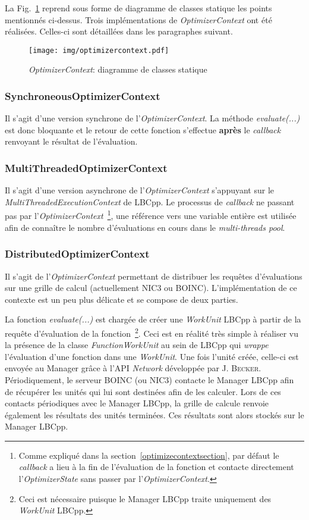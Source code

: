 \documentclass[a4paper, 11pt]{report}
\begin{document}
La Fig.~\ref{optimizercontext} reprend sous forme de diagramme de classes statique les points mentionnés ci-dessus. Trois implémentations de \textit{OptimizerContext} ont été réalisées. Celles-ci sont détaillées dans les paragraphes suivant.

\begin{figure}[!h]
\centering
\texttt{[image: img/optimizercontext.pdf]}
\caption{\textit{OptimizerContext}: diagramme de classes statique}
\label{optimizercontext}
\end{figure}

\subsubsection{SynchroneousOptimizerContext} 
Il s'agit d'une version synchrone de l'\textit{OptimizerContext}. La méthode \textit{evaluate(...)} est donc bloquante et le retour de cette fonction s'effectue \textbf{après} le \textit{callback} renvoyant le résultat de l'évaluation.

\subsubsection{MultiThreadedOptimizerContext} 
Il s'agit d'une version asynchrone de l'\textit{OptimizerContext} s'appuyant sur le \textit{MultiThreadedExecutionContext} de LBCpp. Le processus de \textit{callback} ne passant pas par l'\textit{OptimizerContext}~\footnote{Comme expliqué dans la section~\ref{optimizecontextsection}, par défaut le \textit{callback} a lieu à la fin de l'évaluation de la fonction et contacte directement l'\textit{OptimizerState} sans passer par l'\textit{OptimizerContext}.}, une référence vers une variable entière est utilisée afin de connaître le nombre d'évaluations en cours dans le \textit{multi-threads pool}.

\subsubsection{DistributedOptimizerContext}
Il s'agit de l'\textit{OptimizerContext} permettant de distribuer les requêtes d'évaluations sur une grille de calcul (actuellement \textsc{NIC3} ou \textsc{BOINC}). L'implémentation de ce contexte est un peu plus délicate et se compose de deux parties.

La fonction \textit{evaluate(...)} est chargée de créer une \textit{WorkUnit} LBCpp à partir de la requête d'évaluation de la fonction~\footnote{Ceci est nécessaire puisque le Manager LBCpp traite uniquement des \textit{WorkUnit} LBCpp.}. Ceci est en réalité très simple à réaliser vu la présence de la classe \textit{FunctionWorkUnit} au sein de LBCpp qui \textit{wrappe} l'évaluation d'une fonction dans une \textit{WorkUnit}. Une fois l'unité créée, celle-ci est envoyée au Manager grâce à l'API \textit{Network} développée par J. \textsc{Becker}. Périodiquement, le serveur \textsc{BOINC} (ou \textsc{NIC3}) contacte le Manager LBCpp afin de récupérer les unités qui lui sont destinées afin de les calculer. Lors de ces contacts périodiques avec le Manager LBCpp, la grille de calcule renvoie également les résultats des unités terminées. Ces résultats sont alors stockés sur le Manager LBCpp.
\end{document}
